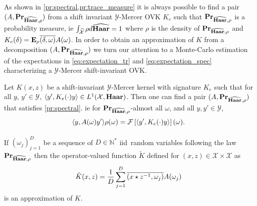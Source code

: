 As shown in \cref{pr:spectral,pr:trace_measure} it is
always possible to find a pair $(A, {\mathbf{{Pr}}}_{\widehat{\mathbf{Haar}},\rho})$ from a
shift invariant $\mathcal{Y}$-Mercer \acl{OVK} $K_e$ such that
${\mathbf{{Pr}}}_{\widehat{\mathbf{Haar}},\rho}$ is a probability measure, \acs{ie}
$\int_{\widehat{\mathcal{X}}} \rho d\widehat{\mathbf{Haar}}=1$ where $\rho$ is the density of
${\mathbf{{Pr}}}_{\widehat{\mathbf{Haar}},\rho}$ and
$K_e(\delta)={\mathbf{{E}}}_{\rho}{\overline{(\delta,\omega)}A(\omega)}$. In
order to obtain an approximation of $K$ from a decomposition $(A,
{\mathbf{{Pr}}}_{\widehat{\mathbf{Haar}},\rho})$ we turn our attention to a Monte-Carlo
estimation of the expectations in \cref{eq:expectation_tr} and
\cref{eq:expectation_spec} characterizing a $\mathcal{Y}$-Mercer
shift-invariant \acl{OVK}. %
\begin{proposition}
    \label{cr:ORFF-kernel} Let $K(x,z)$ be a shift-invariant
    $\mathcal{Y}$-Mercer kernel with signature $K_e$ such that for all $y$,
    $y'\in\mathcal{Y}$, $\langle y', K_e(\cdot)y\rangle\in L^1(\mathcal{X},\mathbf{Haar})$.
    Then one can find a pair $(A, {\mathbf{{Pr}}}_{\widehat{\mathbf{Haar}},\rho})$ that
    satisfies \cref{pr:spectral}. \acs{ie} for
    ${\mathbf{{Pr}}}_{\widehat{\mathbf{Haar}},\rho}$-almost all $\omega$, and all $y,
    y'\in\mathcal{Y}$, 
    \begin{dmath*}
        \inner{y, A(\omega)y'}\rho(\omega)=\FT{\inner{y',
        K_e(\cdot)y}}(\omega). 
    \end{dmath*}
    \paragraph{}
    If $(\omega_j)_{j=1}^D$ be a sequence of
    $D\in\mathbb{N}^*$ \acs{iid}~random variables following the law
    ${\mathbf{{Pr}}}_{\widehat{\mathbf{Haar}},\rho}$ then the operator-valued function
    $\tilde{K}$ defined for $(x,z) \in \mathcal{X}\times
    \mathcal{X}$ as
    \begin{dmath*}
        \tilde{K}(x,z)= \frac{1}{D} \sum_{j=1}^D
        \conj{\pairing{x\groupop\inv{z},\omega_j}} A(\omega_j)
    \end{dmath*}
    is an approximation of $K$.
\end{proposition}
